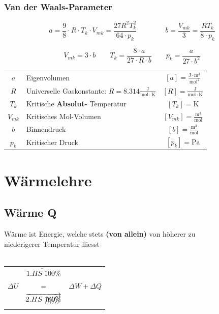 \subsubsection{Van der Waals-Parameter}

$$ \boxed{ a = \frac{9}{8} \cdot R \cdot T_k \cdot V_{mk} = \frac{27 R^2 T_k^2}{64 \cdot p_k}}  \qquad \qquad  \boxed{ b = \frac{V_{mk}}{3} = \frac{R T_k}{8 \cdot p_k}}$$


$$ \boxed{ V_{mk} = 3 \cdot b } \quad \quad  \boxed{ T_k = \frac{8 \cdot a}{27 \cdot R \cdot b} } \quad \quad  \boxed{ p_k = \frac{a}{27 \cdot b^2} } $$



\begin{tabular}{c l c}
	\rule{0pt}{8pt}$a$ & Eigenvolumen & $[a] = \mathrm{\frac{J \cdot m^3}{mol^2}}$ \\
	\rule{0pt}{8pt}$R$ & Universelle Gaskonstante: $R = 8.314 \mathrm{\frac{J}{mol \cdot K}}$ & $[R] = \mathrm{\frac{J}{mol \cdot K}} $ \\
	$T_k$ & Kritische \textbf{Absolut-} Temperatur & $[T_k] = \mathrm{K}$ \\
	\rule{0pt}{8pt}$V_{mk}$ & Kritisches Mol-Volumen & $[V_{mk}] = \mathrm{\frac{m^3}{mol}}$ \\
	\rule{0pt}{8pt}$b$ & Binnendruck & $[b] = \mathrm{\frac{m^3}{mol}}$ \\
	$p_k$ & Kritischer Druck & $[p_k] = \mathrm{Pa}$ \\
\end{tabular}



\section{Wärmelehre}

\subsection{Wärme Q}
Wärme ist Energie, welche stets \textbf{(von allein)} von höherer zu \\
niederigerer Temperatur fliesst \\
\\

\begin{tabular}{l c l}
 & $\underleftarrow{1. HS \; 100\%}$ & \\
$\Delta U$ & $=$ & $\Delta W + \Delta Q$ \\
&  $\overrightarrow{2. HS  \; \xout{100\% }}$ & \\
\end{tabular}

